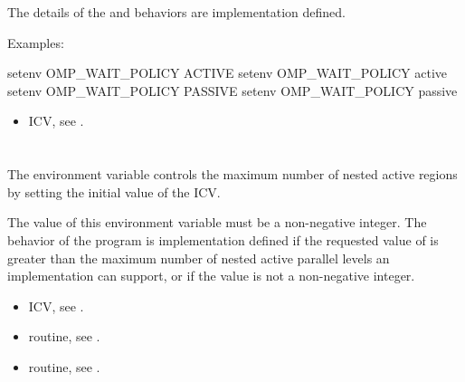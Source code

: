 The details of the  and  behaviors are implementation defined. 

Examples:
\begin{boxedcode}
setenv OMP\_WAIT\_POLICY ACTIVE 
setenv OMP\_WAIT\_POLICY active 
setenv OMP\_WAIT\_POLICY PASSIVE 
setenv OMP\_WAIT\_POLICY passive 
\end{boxedcode}

\crossreferences
\begin{itemize}
\item {} ICV, see . 
\end{itemize}










\section{}
\label{sec:OMP_MAX_ACTIVE_LEVELS}
The  environment variable controls the maximum number 
of nested active  regions by setting the initial value of the  ICV.

The value of this environment variable must be a non-negative integer. The behavior of 
the program is implementation defined if the requested value of 
 is greater than the maximum number of nested active 
parallel levels an implementation can support, or if the value is not a non-negative 
integer.

\crossreferences
\begin{itemize}
\item {} ICV, see .

\item {} routine, see .

\item {} routine, see .
\end{itemize}










